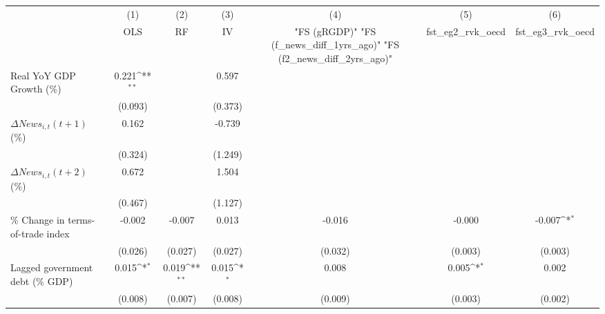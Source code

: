 {
\def\sym#1{\ifmmode^{#1}\else\(^{#1}\)\fi}
\begin{tabular}{l*{6}{c}}
\toprule
                    &\multicolumn{1}{c}{(1)}&\multicolumn{1}{c}{(2)}&\multicolumn{1}{c}{(3)}&\multicolumn{1}{c}{(4)}&\multicolumn{1}{c}{(5)}&\multicolumn{1}{c}{(6)}\\
                    &\multicolumn{1}{c}{OLS}&\multicolumn{1}{c}{RF}&\multicolumn{1}{c}{IV}&\multicolumn{1}{c}{ "FS (gRGDP)"  "FS (f_news_diff_1yrs_ago)"  "FS (f2_news_diff_2yrs_ago)" }&\multicolumn{1}{c}{fst_eg2_rvk_oecd}&\multicolumn{1}{c}{fst_eg3_rvk_oecd}\\
\midrule
Real YoY GDP Growth (\%)&       0.221\sym{**} &                     &       0.597         &                     &                     &                     \\
                    &     (0.093)         &                     &     (0.373)         &                     &                     &                     \\
\addlinespace
$ \Delta News_{i,t}(t+1)$ (\%)&       0.162         &                     &      -0.739         &                     &                     &                     \\
                    &     (0.324)         &                     &     (1.249)         &                     &                     &                     \\
\addlinespace
$ \Delta News_{i,t}(t+2)$ (\%)&       0.672         &                     &       1.504         &                     &                     &                     \\
                    &     (0.467)         &                     &     (1.127)         &                     &                     &                     \\
\addlinespace
\% Change in terms-of-trade index&      -0.002         &      -0.007         &       0.013         &      -0.016         &      -0.000         &      -0.007\sym{*}  \\
                    &     (0.026)         &     (0.027)         &     (0.027)         &     (0.032)         &     (0.003)         &     (0.003)         \\
\addlinespace
Lagged government debt (\% GDP)&       0.015\sym{*}  &       0.019\sym{**} &       0.015\sym{*}  &       0.008         &       0.005\sym{*}  &       0.002         \\
                    &     (0.008)         &     (0.007)         &     (0.008)         &     (0.009)         &     (0.003)         &     (0.002)         \\

\end{tabular}}
